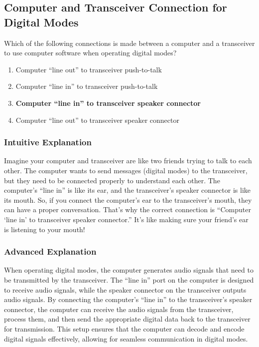 \subsection{Computer and Transceiver Connection for Digital Modes}
\label{T4A07}

\begin{tcolorbox}[colback=gray!10!white,colframe=black!75!black,title=T4A07]
Which of the following connections is made between a computer and a transceiver to use computer software when operating digital modes?
\begin{enumerate}[label=\Alph*)]
    \item Computer “line out” to transceiver push-to-talk
    \item Computer “line in” to transceiver push-to-talk
    \item \textbf{Computer “line in” to transceiver speaker connector}
    \item Computer “line out” to transceiver speaker connector
\end{enumerate}
\end{tcolorbox}

\subsubsection{Intuitive Explanation}
Imagine your computer and transceiver are like two friends trying to talk to each other. The computer wants to send messages (digital modes) to the transceiver, but they need to be connected properly to understand each other. The computer’s “line in” is like its ear, and the transceiver’s speaker connector is like its mouth. So, if you connect the computer’s ear to the transceiver’s mouth, they can have a proper conversation. That’s why the correct connection is “Computer ‘line in’ to transceiver speaker connector.” It’s like making sure your friend’s ear is listening to your mouth!

\subsubsection{Advanced Explanation}
When operating digital modes, the computer generates audio signals that need to be transmitted by the transceiver. The “line in” port on the computer is designed to receive audio signals, while the speaker connector on the transceiver outputs audio signals. By connecting the computer’s “line in” to the transceiver’s speaker connector, the computer can receive the audio signals from the transceiver, process them, and then send the appropriate digital data back to the transceiver for transmission. This setup ensures that the computer can decode and encode digital signals effectively, allowing for seamless communication in digital modes.


